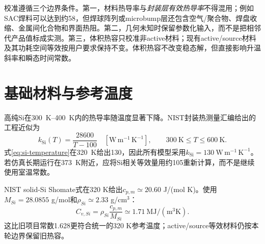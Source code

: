 \documentclass[UTF8,zihao=-4]{ctexart}
\newcommand{\unitk}{\mathrm{W\,m^{-1}\,K^{-1}}}
\begin{document}
校准遵循三个边界条件。第一，材料热导率与\emph{封装层有效热导率}不得混用；例如SAC焊料可以达到约\SI{58}{\tcond}，但焊球阵列或microbump层还包含空气/聚合物、焊盘收缩、金属间化合物和界面热阻。第二，几何未知时保留参数化输入，而不是把相邻代产品值标成实测。第三，体积热容只校准非active材料；现有active/source材料及其功耗空间等效按用户要求保持不变。体积热容不改变稳态解，但直接影响升温斜率和瞬态时间常数。

\section{基础材料与参考温度}

高纯Si在\SIrange{300}{400}{\kelvin}内的热导率随温度显著下降\cite{GlassbrennerSlack1964}。NIST封装热测量汇编给出的工程近似为\cite{NIST40086}
\begin{equation}
  k_{\mathrm{Si}}(T)=\frac{28600}{T-100}\quad [\unitk],
  \qquad \SI{300}{\kelvin}\le T\le\SI{600}{\kelvin}.
  \label{eq:si-temperature}
\end{equation}
式\eqref{eq:si-temperature}在\SI{320}{\kelvin}给出\SI{130}{\tcond}，因此所有模型采用$k_{\mathrm{Si}}=130~\unitk$。若仿真长期运行在\SI{373}{\kelvin}附近，应将Si相关等效量用约\SI{105}{\tcond}重新计算，而不是继续使用室温常数。

NIST solid-Si Shomate式在320 K给出$c_{p,m}\simeq20.60$ J/(mol K)\cite{NISTSiliconCp}。使用$M_{Si}=28.0855$ g/mol和$\rho_{Si}\simeq2.33$ g/cm$^3$：
\begin{equation}
  C_{v,Si}=\rho_{Si}\frac{c_{p,m}}{M_{Si}}
  \simeq1.71~\mathrm{MJ/(m^3K)}.
\end{equation}
这比旧项目常数1.628更符合统一的320 K参考温度；active/source等效材料仍按本轮边界保留旧热容。
\end{document}

